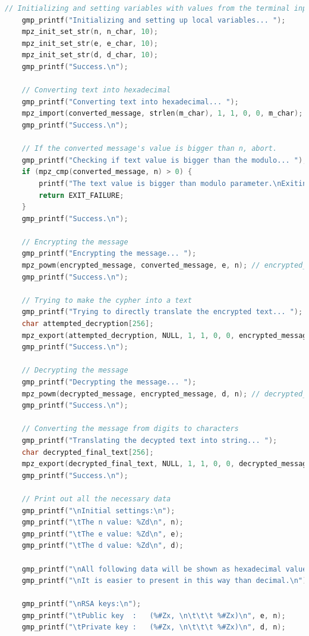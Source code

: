 \documentclass[a4paper, 12pt]{article}
\begin{document}
\begin{lstlisting}[language=C, caption=Source Code of rsa.c]
    // Initializing and setting variables with values from the terminal input
    gmp_printf("Initializing and setting up local variables... ");
    mpz_init_set_str(n, n_char, 10);
    mpz_init_set_str(e, e_char, 10);
    mpz_init_set_str(d, d_char, 10);
    gmp_printf("Success.\n");
    
    // Converting text into hexadecimal
    gmp_printf("Converting text into hexadecimal... ");
    mpz_import(converted_message, strlen(m_char), 1, 1, 0, 0, m_char);
    gmp_printf("Success.\n");
  
    // If the converted message's value is bigger than n, abort.
    gmp_printf("Checking if text value is bigger than the modulo... ");
    if (mpz_cmp(converted_message, n) > 0) {
        printf("The text value is bigger than modulo parameter.\nExiting...\n");
        return EXIT_FAILURE;
    }
    gmp_printf("Success.\n");
    
    // Encrypting the message
    gmp_printf("Encrypting the message... ");
    mpz_powm(encrypted_message, converted_message, e, n); // encrypted_message = pow(m, e) % n
    gmp_printf("Success.\n");
    
    // Trying to make the cypher into a text
    gmp_printf("Trying to directly translate the encrypted text... ");
    char attempted_decryption[256];
    mpz_export(attempted_decryption, NULL, 1, 1, 0, 0, encrypted_message);
    gmp_printf("Success.\n");
    
    // Decrypting the message
    gmp_printf("Decrypting the message... ");
    mpz_powm(decrypted_message, encrypted_message, d, n); // decrypted_message = pow(encrypted_message, d) % n
    gmp_printf("Success.\n");
    
    // Converting the message from digits to characters
    gmp_printf("Translating the decypted text into string... ");
    char decrypted_final_text[256];
    mpz_export(decrypted_final_text, NULL, 1, 1, 0, 0, decrypted_message);
    gmp_printf("Success.\n");
    
    // Print out all the necessary data 
    gmp_printf("\nInitial settings:\n");
    gmp_printf("\tThe n value: %Zd\n", n);
    gmp_printf("\tThe e value: %Zd\n", e);
    gmp_printf("\tThe d value: %Zd\n", d);
    
    gmp_printf("\nAll following data will be shown as hexadecimal values.");
    gmp_printf("\nIt is easier to present in this way than decimal.\n");
    
    gmp_printf("\nRSA keys:\n");
    gmp_printf("\tPublic key  :   (%#Zx, \n\t\t\t %#Zx)\n", e, n);
    gmp_printf("\tPrivate key :   (%#Zx, \n\t\t\t %#Zx)\n", d, n);
    

\end{lstlisting}
\end{document}

